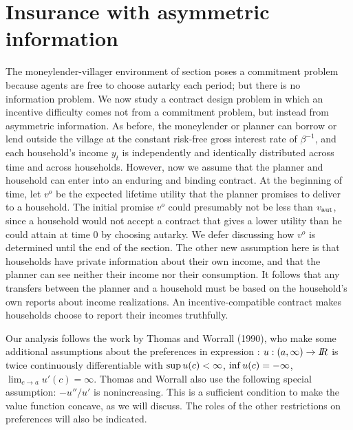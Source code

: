 \section{Insurance with asymmetric information}
%
%
 The moneylender-villager environment of
section  poses a
commitment problem  because  agents are free to choose autarky
each period; but there is  no information problem. We now study a
contract design problem in which an  incentive difficulty  comes not from
a commitment problem, but instead from asymmetric information. As
before, the moneylender or planner can borrow or lend outside the village at the
constant risk-free gross interest rate of $\beta^{-1}$, and each
household's income $y_t$ is independently and identically
distributed across time and across households. However, now we
assume that the planner and household can  enter
into an enduring and   binding contract. At the beginning of time,
let $v^o$ be the expected lifetime utility that the planner
promises to deliver to a household. The initial promise $v^o$
could presumably not be less than $v_{\rm aut}$, since a household
would not accept a contract that gives a lower utility than he could attain at time $0$ by choosing autarky.
 We defer discussing how $v^o$ is
determined until the end of the section. The other new assumption
here is that households have private information about their own
income, and that the planner can see neither their income nor their
consumption. It follows that any transfers between the
planner and a household must be based on the household's own
reports about income realizations. An incentive-compatible
contract makes households choose to report their incomes
truthfully.

Our analysis follows the work by Thomas and Worrall (1990),
%
 who
make some  additional assumptions about the preferences in expression :
$u:(a, \infty) \rightarrow {{I\kern-0.3em R}}$ is twice continuously
differentiable with ${\rm sup}\,u(c)<\infty$, ${\rm inf}\,u(c)=-\infty$,
$\lim_{c\rightarrow a}u'(c)=\infty$.
Thomas and Worrall also use the following special assumption:
\medskip
{}  $-u''/u'$ is nonincreasing.
\medskip
\noindent
This is a sufficient condition to make the value function
concave, as we will discuss.  The roles of the other restrictions
on preferences will also be indicated.
%
%

